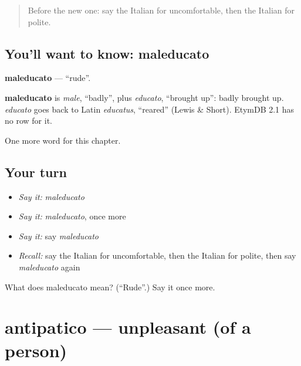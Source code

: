 \label{lesson:IT-C156-maleducato}



\begin{quote}
Before the new one: say the Italian for uncomfortable, then the Italian for polite.
\end{quote}

\subsection*{You'll want to know: maleducato}
\textbf{maleducato} — \textquotedblleft{}rude\textquotedblright{}.

\begin{cousinweb}
\textbf{maleducato} is \emph{male}, \textquotedblleft{}badly\textquotedblright{}, plus \emph{educato}, \textquotedblleft{}brought up\textquotedblright{}: badly brought up. \emph{educato} goes back to Latin \emph{educatus}, \textquotedblleft{}reared\textquotedblright{} (Lewis \& Short). EtymDB 2.1 has no row for it.
\end{cousinweb}

\begin{grammarlens}[title={What you've built}]
One more word for this chapter.
\end{grammarlens}

\subsection*{Your turn}
\begin{itemize}
\raggedright
  \item \emph{Say it:} \emph{maleducato}
  \item \emph{Say it:} \emph{maleducato}, once more
  \item \emph{Say it:} say \emph{maleducato}
  \item \emph{Recall:} say the Italian for uncomfortable, then the Italian for polite, then say \emph{maleducato} again
\end{itemize}

\begin{tcolorbox}[breakable,colback=teal!4,colframe=teal!35!black,title={Before you move on}]
What does maleducato mean? (\textquotedblleft{}Rude\textquotedblright{}.) Say it once more.
\end{tcolorbox}
\section[antipatico]{antipatico — unpleasant (of a person)}

